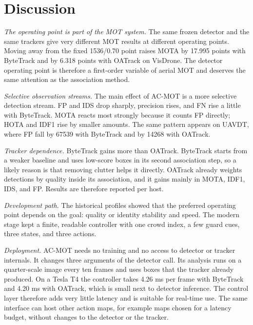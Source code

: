 \section{Discussion}\label{sec:discussion}

\emph{The operating point is part of the MOT system.} The same frozen detector
and the same trackers give very different MOT results at different operating
points. Moving away from the fixed 1536/0.70 point raises MOTA by 17.995 points
with ByteTrack and by 6.318 points with OATrack on VisDrone. The detector
operating point is therefore a first-order variable of aerial MOT and deserves
the same attention as the association method.

\emph{Selective observation streams.} The main effect of AC-MOT is a more
selective detection stream. FP and IDS drop sharply, precision rises, and FN
rise a little with ByteTrack. MOTA reacts most strongly because it counts FP
directly; HOTA and IDF1 rise by smaller amounts. The same pattern appears on
UAVDT, where FP fall by 67539 with ByteTrack and by 14268 with OATrack.

\emph{Tracker dependence.} ByteTrack gains more than OATrack. ByteTrack starts
from a weaker baseline and uses low-score boxes in its second association
step, so a likely reason is that removing clutter helps it directly. OATrack
already weights detections by quality inside its association, and it gains
mainly in MOTA, IDF1, IDS, and FP. Results are therefore reported per host.

\emph{Development path.} The historical profiles showed that the preferred
operating point depends on the goal: quality or identity stability and speed.
The modern stage kept a finite, readable controller with one crowd index, a few
guard cues, three states, and three actions.

\emph{Deployment.} AC-MOT needs no training and no access to detector or
tracker internals. It changes three arguments of the detector call. Its
analysis runs on a quarter-scale image every ten frames and uses boxes that
the tracker already produced. On a Tesla T4 the controller takes 4.26 ms per
frame with ByteTrack and 4.20 ms with OATrack, which is small next to detector
inference. The control layer therefore adds very little latency and is
suitable for real-time use. The same interface can host other action maps, for
example maps chosen for a latency budget, without changes to the detector or
the tracker.
